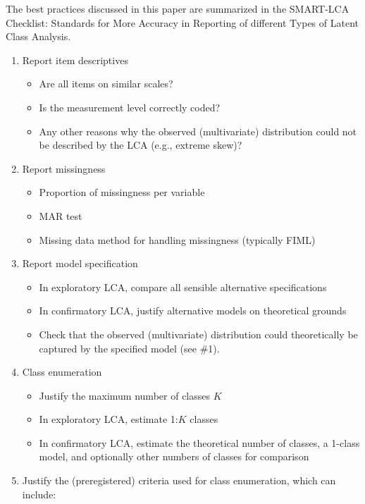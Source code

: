 \documentclass[
  ,man,floatsintext]{apa6}
\providecommand{\tightlist}{%
  \setlength{\itemsep}{0pt}\setlength{\parskip}{0pt}}
\begin{document}
The best practices discussed in this paper are summarized in the SMART-LCA Checklist: Standards for More Accuracy in Reporting of different Types of Latent Class Analysis.

\begin{enumerate}
\def\labelenumi{\arabic{enumi}.}
\tightlist
\item
  Report item descriptives

  \begin{itemize}
  \tightlist
  \item
    Are all items on similar scales?
  \item
    Is the measurement level correctly coded?
  \item
    Any other reasons why the observed (multivariate) distribution could not be described by the LCA (e.g., extreme skew)?
  \end{itemize}
\item
  Report missingness

  \begin{itemize}
  \tightlist
  \item
    Proportion of missingness per variable
  \item
    MAR test
  \item
    Missing data method for handling missingness (typically FIML)
  \end{itemize}
\item
  Report model specification

  \begin{itemize}
  \tightlist
  \item
    In exploratory LCA, compare all sensible alternative specifications
  \item
    In confirmatory LCA, justify alternative models on theoretical grounds
  \item
    Check that the observed (multivariate) distribution could theoretically be captured by the specified model (see \#1).
  \end{itemize}
\item
  Class enumeration

  \begin{itemize}
  \tightlist
  \item
    Justify the maximum number of classes \(K\)
  \item
    In exploratory LCA, estimate 1:\(K\) classes
  \item
    In confirmatory LCA, estimate the theoretical number of classes, a 1-class model, and optionally other numbers of classes for comparison
  \end{itemize}
\item
  Justify the (preregistered) criteria used for class enumeration, which can include:


\end{enumerate}
\end{document}
